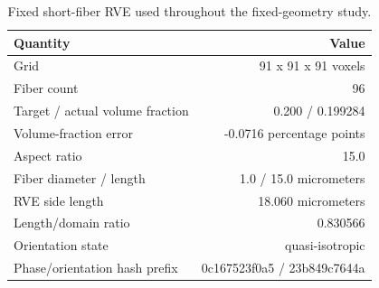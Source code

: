 \begin{table}
\centering
\small
\caption{Fixed short-fiber RVE used throughout the fixed-geometry study.}
\label{tab:geometry}
\begin{tabular}{lr}
\toprule
Quantity & Value \\
\midrule
Grid & 91 x 91 x 91 voxels \\
Fiber count & 96 \\
Target / actual volume fraction & 0.200 / 0.199284 \\
Volume-fraction error & -0.0716 percentage points \\
Aspect ratio & 15.0 \\
Fiber diameter / length & 1.0 / 15.0 micrometers \\
RVE side length & 18.060 micrometers \\
Length/domain ratio & 0.830566 \\
Orientation state & quasi-isotropic \\
Phase/orientation hash prefix & 0c167523f0a5 / 23b849c7644a \\
\bottomrule
\end{tabular}
\end{table}
